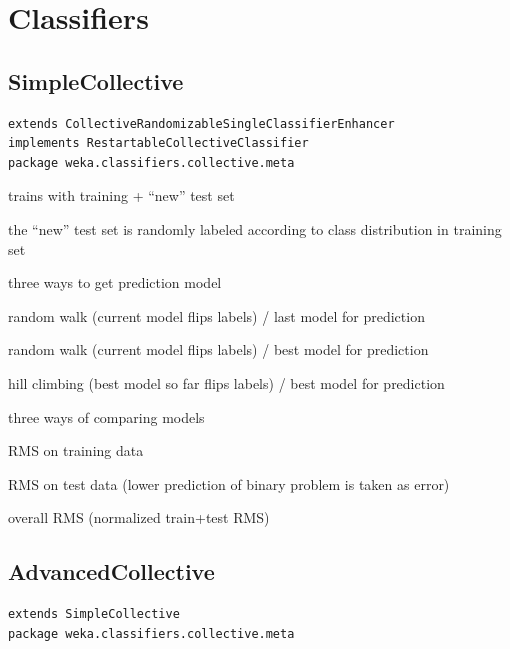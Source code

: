 \documentclass[a4paper]{book}
\begin{document}
\section{Classifiers}
\subsection{SimpleCollective}
\begin{verbatim}
extends CollectiveRandomizableSingleClassifierEnhancer
implements RestartableCollectiveClassifier
package weka.classifiers.collective.meta
\end{verbatim}

\begin{tight_itemize}
	\item trains with training + ``new'' test set
	\item the ``new'' test set is randomly labeled according to class distribution in training set
	\item three ways to get prediction model
	\begin{tight_enumerate}
		\item random walk (current model flips labels) / last model for prediction
		\item random walk (current model flips labels) / best model for prediction
		\item hill climbing (best model so far flips labels) / best model for prediction
	\end{tight_enumerate}
	\item three ways of comparing models
	\begin{tight_enumerate}
		\item RMS on training data
		\item RMS on test data (lower prediction of binary problem is taken as error)
		\item overall RMS (normalized train+test RMS)
	\end{tight_enumerate}
\end{tight_itemize}

\subsection{AdvancedCollective}
\begin{verbatim}
extends SimpleCollective
package weka.classifiers.collective.meta
\end{verbatim}
\end{document}
